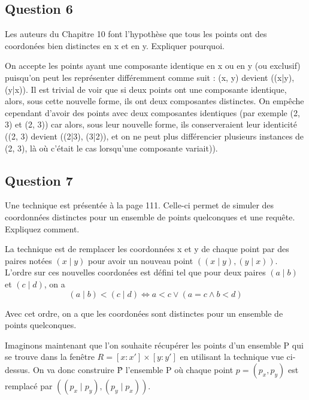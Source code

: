 \documentclass{article}
\newcommand{\gray}{\color{gray}}
\newcommand{\black}{\color{black}}
\begin{document}
\black

\newpage

\subsection{Question 6} Les auteurs du Chapitre 10 font l'hypothèse que tous les points ont des coordonées bien
distinctes en x et en y. Expliquer pourquoi.


\bigskip

\gray
On accepte les points ayant une composante identique en x ou en y (ou exclusif) puisqu'on peut les représenter différemment comme suit : (x, y) devient ((x|y), (y|x)). 
Il est trivial de voir que si deux points ont une composante identique, alors, sous cette nouvelle forme, ils ont deux composantes distinctes. 
On empêche cependant d'avoir des points avec deux composantes identiques (par exemple (2, 3) et (2, 3)) 
car alors, sous leur nouvelle forme, ils conserveraient leur identicité ((2, 3) devient ((2|3), (3|2)), et on ne peut plus différencier plusieurs instances de (2, 3), 
là où c'était le cas lorsqu'une composante variait)).
\black


\subsection{Question 7} Une technique est présentée à la page 111. Celle-ci permet de simuler des coordonnées
distinctes pour un ensemble de points quelconques et une requête. Expliquez comment.


\bigskip

La technique est de remplacer les coordonnées x et y de chaque point par des paires notées $(x \mid y)$ pour avoir un nouveau point $((x \mid y), (y \mid x))$.
L'ordre sur ces nouvelles coordonées est défini tel que pour deux paires $(a \mid b)$ et $(c \mid d)$, on a 
\[
    (a \mid b) < (c \mid d) \iff a < c \lor (a = c \land b < d)  
\]

Avec cet ordre, on a que les coordonées sont distinctes pour un ensemble de points quelconques.

\medskip
Imaginons maintenant que l'on souhaite récupérer les points d'un ensemble P qui se trouve dans la fenêtre $R = [x:x'] \times [y:y']$ 
en utilisant la technique vue ci-dessus. On va donc construire \^P l'ensemble P où chaque point $p = (p_x,p_y)$ est remplacé par $((p_x \mid p_y), (p_y \mid p_x))$.
\end{document}
